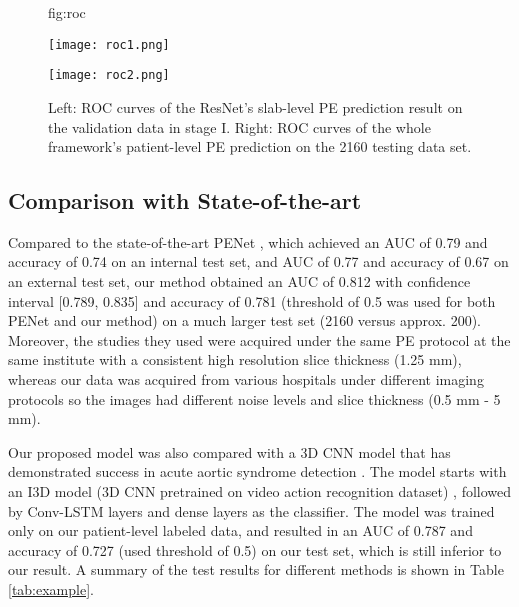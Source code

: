 \documentclass{midl} %
\begin{document}

\begin{figure}[htbp]
\floatconts
 {fig:roc}
 {\caption{Left: ROC curves of the ResNet's slab-level PE prediction result on the validation data in stage I. Right: ROC curves of the whole framework's patient-level PE prediction on the 2160 testing data set.}}
 {\begin{minipage}[b]{0.45\linewidth}
    \centering
    \centerline{\texttt{[image: roc1.png]}}
 \end{minipage}
 \begin{minipage}[b]{0.45\linewidth}
    \centering
    \centerline{\texttt{[image: roc2.png]}}
 \end{minipage}}
\end{figure}

\subsection{Comparison with State-of-the-art}
\label{ssec:stateofart}

Compared to the state-of-the-art PENet \cite{Huang2019PENet}, which achieved an AUC of 0.79 and accuracy of 0.74 on an internal test set, and AUC of 0.77 and accuracy of 0.67 on an external test set, our method obtained an AUC of 0.812 with confidence interval [0.789, 0.835] \cite{sun2014fast} and accuracy of 0.781 (threshold of 0.5 was used for both PENet and our method) on a much larger test set (2160 versus approx. 200). Moreover, the studies they used were acquired under the same PE protocol at the same institute with a consistent high resolution slice thickness (1.25 mm), whereas our data was acquired from various hospitals under different imaging protocols so the images had different noise levels and slice thickness (0.5 mm - 5 mm).

Our proposed model was also compared with a 3D CNN model that has demonstrated success in acute aortic syndrome detection \cite{yellapragada2020deep}. The model starts with an I3D model (3D CNN pretrained on video action recognition dataset) \cite{carreira2017quo}, followed by Conv-LSTM layers and dense layers as the classifier. The model was trained only on our patient-level labeled data, and resulted in an AUC of 0.787 and accuracy of 0.727 (used threshold of 0.5) on our test set, which is still inferior to our result. A summary of the test results for different methods is shown in Table \ref{tab:example}.
\end{document}
